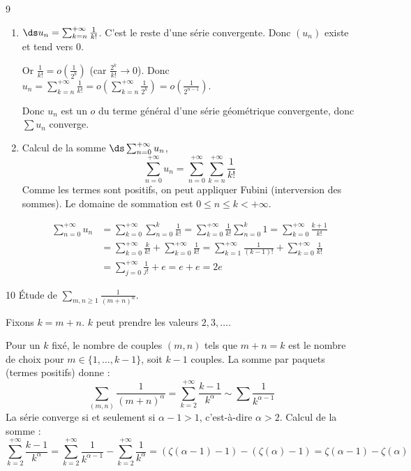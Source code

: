 \begin{correction}{9}
\begin{enumerate}
    \item 
        $\ds u_n = \sum_{k=n}^{+ \infty} \frac{1}{k!}$. C'est le reste d'une série convergente. Donc $(u_n)$ existe et tend vers 0.
    
        Or $\frac{1}{k!} = o\left(\frac{1}{2^k}\right)$ (car $\frac {2^k} {k!} \to 0$).
        Donc $\displaystyle u_n = \sum_{k=n}^{+\infty} \frac{1}{k!} = o \left(\sum_{k=n}^{+\infty} \frac{1}{2^k} \right) = o \left(\frac{1}{2^{n-1}}\right)$.
        
        Donc $u_n$ est un $o$ du terme général d'une série géométrique convergente, donc $\sum u_n$ converge.

    \item Calcul de la somme $\ds \sum_{n=0}^{+ \infty} u_n$,
        $$ \sum_{n=0}^{+\infty} u_n = \sum_{n=0}^{+\infty} \sum_{k=n}^{+\infty} \frac{1}{k!} $$
        Comme les termes sont positifs, on peut appliquer Fubini (interversion des sommes).
        Le domaine de sommation est $0 \leqslant n \leqslant k < +\infty$.
        
        \begin{align*}
            \sum_{n=0}^{+\infty} u_n &= \sum_{k=0}^{+\infty} \sum_{n=0}^k \frac{1}{k!} = \sum_{k=0}^{+\infty} \frac{1}{k!} \sum_{n=0}^k 1 = \sum_{k=0}^{+\infty} \frac{k+1}{k!} \\
            &= \sum_{k=0}^{+\infty} \frac{k}{k!} + \sum_{k=0}^{+\infty} \frac{1}{k!} = \sum_{k=1}^{+\infty} \frac{1}{(k-1)!} + \sum_{k=0}^{+\infty} \frac{1}{k!} \\
            &= \sum_{j=0}^{+\infty} \frac{1}{j!} + e = e + e = 2e
        \end{align*}
\end{enumerate}
\end{correction}

\begin{correction}{10}
    Étude de $\sum_{m,n \ge 1} \frac{1}{(m+n)^\alpha}$.

    Fixons $k = m+n$. $k$ peut prendre les valeurs $2, 3, \dots$.

    Pour un $k$ fixé, le nombre de couples $(m,n)$ tels que $m+n=k$ est le nombre de choix pour $m \in \{1, \dots, k-1\}$, soit $k-1$ couples.
    La somme par paquets (termes positifs) donne :
    $$ \sum_{(m,n)} \frac{1}{(m+n)^\alpha} = \sum_{k=2}^{+\infty} \frac{k-1}{k^\alpha} \sim \sum \frac{1}{k^{\alpha-1}} $$
    La série converge si et seulement si $\alpha-1 > 1$, c'est-à-dire $\alpha > 2$.
    Calcul de la somme :
    $$ \sum_{k=2}^{+\infty} \frac{k-1}{k^\alpha} = \sum_{k=2}^{+\infty} \frac{1}{k^{\alpha-1}} - \sum_{k=2}^{+\infty} \frac{1}{k^\alpha} = (\zeta(\alpha-1)-1) - (\zeta(\alpha)-1) = \zeta(\alpha-1) - \zeta(\alpha) $$
\end{correction}

